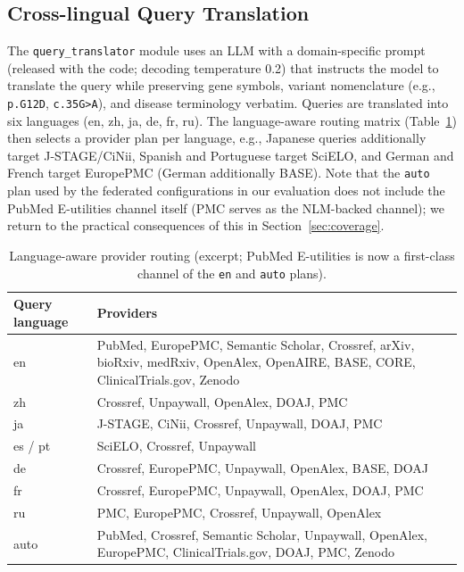 \documentclass[sigconf,screen]{acmart}
\begin{document}
\subsection{Cross-lingual Query Translation}
\label{sec:translation}

The \texttt{query\_translator} module uses an LLM with a domain-specific
prompt (released with the code; decoding temperature 0.2) that instructs the
model to translate the query while preserving gene
symbols, variant nomenclature (e.g., \texttt{p.G12D}, \texttt{c.35G>A}),
and disease terminology verbatim. Queries are translated into six languages
(en, zh, ja, de, fr, ru). The language-aware routing matrix
(Table~\ref{tab:routing}) then selects a provider plan per language, e.g.,
Japanese queries additionally target J-STAGE/CiNii, Spanish and
Portuguese target SciELO, and German and French target EuropePMC
(German additionally BASE). Note that the \texttt{auto} plan used by the
federated configurations in our evaluation does not include the PubMed
E-utilities channel itself (PMC serves as the NLM-backed channel); we
return to the practical consequences of this in
Section~\ref{sec:coverage}.

\begin{table}[t]
\centering
\small
\begin{threeparttable}
\caption{Language-aware provider routing (excerpt; PubMed E-utilities is
now a first-class channel of the \texttt{en} and \texttt{auto} plans).}
\label{tab:routing}
\begin{tabular}{@{}p{1.5cm}p{5.3cm}@{}}
\toprule
Query language & Providers \\
\midrule
en & PubMed, EuropePMC, Semantic Scholar, Crossref, arXiv, bioRxiv, medRxiv, OpenAlex, OpenAIRE, BASE, CORE, ClinicalTrials.gov, Zenodo \\
zh & Crossref, Unpaywall, OpenAlex, DOAJ, PMC \\
ja & J-STAGE, CiNii, Crossref, Unpaywall, DOAJ, PMC \\
es / pt & SciELO, Crossref, Unpaywall \\
de & Crossref, EuropePMC, Unpaywall, OpenAlex, BASE, DOAJ \\
fr & Crossref, EuropePMC, Unpaywall, OpenAlex, DOAJ, PMC \\
ru & PMC, EuropePMC, Crossref, Unpaywall, OpenAlex \\
auto & PubMed, Crossref, Semantic Scholar, Unpaywall, OpenAlex, EuropePMC, ClinicalTrials.gov, DOAJ, PMC, Zenodo \\
\bottomrule
\end{tabular}
\end{threeparttable}
\end{table}
\end{document}
